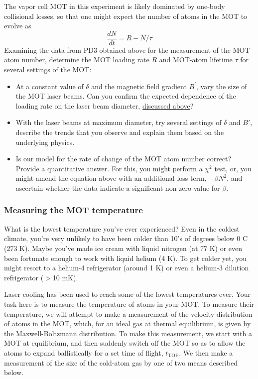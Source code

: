\documentclass{../lab}
\begin{document}
The vapor cell MOT in this experiment is likely dominated by one-body collisional losses, so that one might expect the number of atoms in the MOT to evolve as
\begin{equation}
    \frac{d N}{dt} = R -  N / \tau
\end{equation}
Examining the data from PD3 obtained above for the measurement of the MOT atom number, determine the MOT loading rate $ R $ and MOT-atom lifetime $\tau$ for several settings of the MOT:

\begin{itemize}
    \item At a constant value of $\delta$ and the magnetic field gradient $B^\prime $, vary the size of the MOT laser beams. Can you confirm the expected dependence of the loading rate on the laser beam diameter, \hyperref[subsubsec:CaptureVelocity]{discussed above}?

    \item With the laser beams at maximum diameter, try several settings of $\delta$ and $B'$, describe the trends that you observe and explain them based on the underlying physics.

    \item Is our model for the rate of change of the MOT atom number correct? Provide a quantitative answer. For this, you might perform a $\chi^2$ test, or, you might amend the equation above with an additional loss term, $- \beta N^2$, and ascertain whether the data indicate a significant non-zero value for $\beta$.
\end{itemize}

\subsubsection{Measuring the MOT temperature}
\label{subsubsec:MeasuringMOTTemperature}

What is the lowest temperature you've ever experienced? Even in the coldest climate, you're very unlikely to have been colder than 10's of degrees below 0 C (273 K). Maybe you've made ice cream with liquid nitrogen (at 77 K) or even been fortunate enough to work with liquid helium (4 K). To get colder yet, you might resort to a helium-4 refrigerator (around 1 K) or even a helium-3 dilution refrigerator ($>$10 mK).

Laser cooling has been used to reach some of the lowest temperatures ever. Your task here is to measure the temperature of atoms in your MOT. To measure their temperature, we will attempt to make a measurement of the velocity distribution of atoms in the MOT, which, for an ideal gas at thermal equilibrium, is given by the Maxwell-Boltzmann distribution. To make this measurement, we start with a MOT at equilibrium, and then suddenly switch off the MOT so as to allow the atoms to expand ballistically for a set time of flight, $t_\text{TOF}$. We then make a measurement of the size of the cold-atom gas by one of two means described below.
\end{document}
